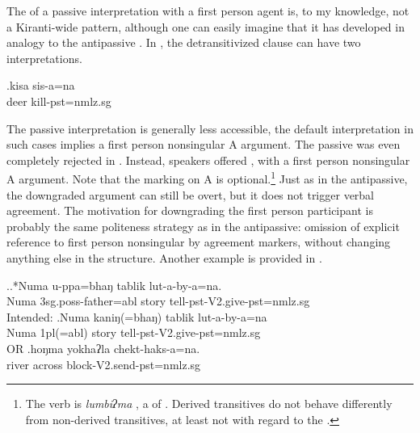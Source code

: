 The  of a passive interpretation with a first person agent is, to my knowledge, not a Kiranti-wide pattern, although one can easily imagine that it has developed in analogy to the antipassive . In \Next, the detransitivized clause  can have two interpretations. 

\exg.kisa sis-a=na\\
deer kill{\sc [3sg]-pst=nmlz.sg}\\
 

The passive interpretation is generally less accessible, the default interpretation in such cases implies a first person nonsingular A argument. The passive was even completely rejected in \Next[a]. Instead, speakers  offered \Next[b], with a first person nonsingular A argument. Note that the  marking on A is optional.\footnote{The verb is \emph{lumbiʔma} , a  of . Derived transitives do not behave differently from non-derived transitives, at least not with regard to the .} Just as in the antipassive, the downgraded argument can still be overt, but it does not trigger verbal agreement. The motivation for downgrading the first person participant is  probably the same politeness strategy as in the antipassive: omission of explicit reference to first person nonsingular by agreement markers, without changing anything else in the structure. Another example is provided in \Next[c].  


\ex.\ag.*Numa u-ppa=bhaŋ tablik lut-a-by-a=na.\\
Numa {\sc 3sg.poss-}father{\sc =abl} story tell{\sc [3sg]-pst-V2.give-pst=nmlz.sg}\\
Intended: 
\bg.Numa kaniŋ(=bhaŋ) tablik lut-a-by-a=na\\
Numa  {\sc 1pl(=abl)} story tell{\sc [3sg]-pst-V2.give-pst=nmlz.sg}\\
 OR 
\bg.hoŋma  yokhaʔla chekt-haks-a=na.\\
river across block{\sc [3sg]-V2.send-pst=nmlz.sg} \\


